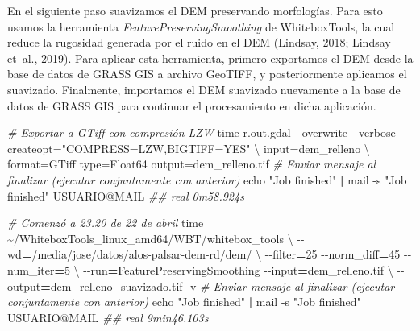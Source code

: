 \documentclass[spanish]{article}
\newenvironment{Shaded}{\begin{snugshade}}{\end{snugshade}}
\newcommand{\AttributeTok}[1]{\textcolor[rgb]{0.77,0.63,0.00}{#1}}
\newcommand{\BuiltInTok}[1]{#1}
\newcommand{\CommentTok}[1]{\textcolor[rgb]{0.56,0.35,0.01}{\textit{#1}}}
\newcommand{\DataTypeTok}[1]{\textcolor[rgb]{0.13,0.29,0.53}{#1}}
\newcommand{\ExtensionTok}[1]{#1}
\newcommand{\KeywordTok}[1]{\textcolor[rgb]{0.13,0.29,0.53}{\textbf{#1}}}
\newcommand{\NormalTok}[1]{#1}
\newcommand{\OperatorTok}[1]{\textcolor[rgb]{0.81,0.36,0.00}{\textbf{#1}}}
\newcommand{\StringTok}[1]{\textcolor[rgb]{0.31,0.60,0.02}{#1}}
\begin{document}
En el siguiente paso suavizamos el DEM preservando morfologías. Para
esto usamos la herramienta \emph{FeaturePreservingSmoothing} de
WhiteboxTools, la cual reduce la rugosidad generada por el ruido en el
DEM (Lindsay, 2018; Lindsay et~al., 2019). Para aplicar esta
herramienta, primero exportamos el DEM desde la base de datos de GRASS
GIS a archivo GeoTIFF, y posteriormente aplicamos el suavizado.
Finalmente, importamos el DEM suavizado nuevamente a la base de datos de
GRASS GIS para continuar el procesamiento en dicha aplicación.

\begin{Shaded}
\begin{Highlighting}[]
\CommentTok{\# Exportar a GTiff con compresión LZW}
\BuiltInTok{time}\NormalTok{ r.out.gdal }\AttributeTok{{-}{-}overwrite} \AttributeTok{{-}{-}verbose}\NormalTok{ createopt=}\StringTok{"COMPRESS=LZW,BIGTIFF=YES"} \DataTypeTok{\textbackslash{}}
\NormalTok{  input=dem\_relleno }\DataTypeTok{\textbackslash{}}
\NormalTok{  format=GTiff type=Float64 output=dem\_relleno.tif}
\CommentTok{\# Enviar mensaje al finalizar (ejecutar conjuntamente con anterior)}
\BuiltInTok{echo} \StringTok{"Job finished"} \KeywordTok{|} \ExtensionTok{mail} \AttributeTok{{-}s} \StringTok{"Job finished"}\NormalTok{ USUARIO@MAIL}
\CommentTok{\#\# real 0m58.924s}

\CommentTok{\# Comenzó a 23.20 de 22 de abril}
\BuiltInTok{time}\NormalTok{ \textasciitilde{}/WhiteboxTools\_linux\_amd64/WBT/whitebox\_tools }\DataTypeTok{\textbackslash{}}
  \AttributeTok{{-}{-}wd}\OperatorTok{=}\StringTok{\textquotesingle{}/media/jose/datos/alos{-}palsar{-}dem{-}rd/dem/\textquotesingle{}} \DataTypeTok{\textbackslash{}}
  \AttributeTok{{-}{-}filter}\OperatorTok{=}\NormalTok{25 }\AttributeTok{{-}{-}norm\_diff}\OperatorTok{=}\NormalTok{45 }\AttributeTok{{-}{-}num\_iter}\OperatorTok{=}\NormalTok{5 }\DataTypeTok{\textbackslash{}}
  \AttributeTok{{-}{-}run}\OperatorTok{=}\NormalTok{FeaturePreservingSmoothing }\AttributeTok{{-}{-}input}\OperatorTok{=}\StringTok{\textquotesingle{}dem\_relleno.tif\textquotesingle{}} \DataTypeTok{\textbackslash{}}
  \AttributeTok{{-}{-}output}\OperatorTok{=}\StringTok{\textquotesingle{}dem\_relleno\_suavizado.tif\textquotesingle{}} \AttributeTok{{-}v}
\CommentTok{\# Enviar mensaje al finalizar (ejecutar conjuntamente con anterior)}
\BuiltInTok{echo} \StringTok{"Job finished"} \KeywordTok{|} \ExtensionTok{mail} \AttributeTok{{-}s} \StringTok{"Job finished"}\NormalTok{ USUARIO@MAIL}
\CommentTok{\#\# real 9min46.103s}
\end{Highlighting}
\end{Shaded}
\end{document}
